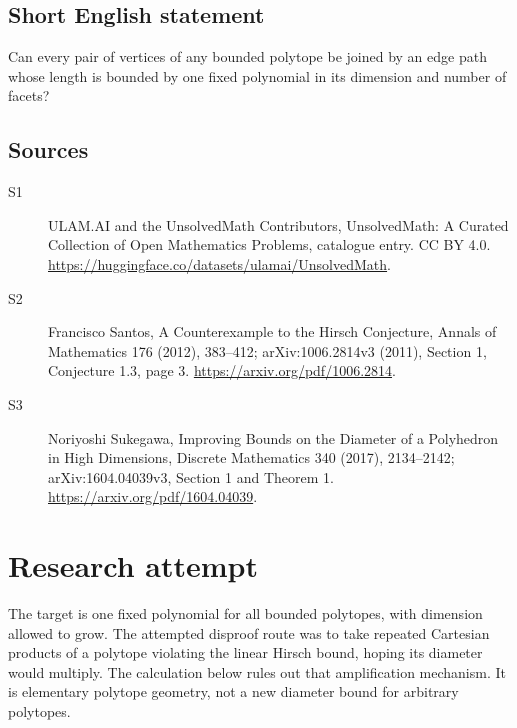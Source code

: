 \documentclass[11pt]{article}
\begin{document}
\subsection{Short English statement}
Can every pair of vertices of any bounded polytope be joined by an edge path whose length is bounded by one fixed polynomial in its dimension and number of facets?
\subsection{Sources}
\begin{description}
\item[S1] ULAM.AI and the UnsolvedMath Contributors, UnsolvedMath: A Curated Collection of Open Mathematics Problems, catalogue entry. CC BY 4.0. \url{https://huggingface.co/datasets/ulamai/UnsolvedMath}.
\item[S2] Francisco Santos, A Counterexample to the Hirsch Conjecture, Annals of Mathematics 176 (2012), 383--412; arXiv:1006.2814v3 (2011), Section 1, Conjecture 1.3, page 3. \url{https://arxiv.org/pdf/1006.2814}.
\item[S3] Noriyoshi Sukegawa, Improving Bounds on the Diameter of a Polyhedron in High Dimensions, Discrete Mathematics 340 (2017), 2134--2142; arXiv:1604.04039v3, Section 1 and Theorem 1. \url{https://arxiv.org/pdf/1604.04039}.
\end{description}
\label{end:statement}


\section{Research attempt}
The target is one fixed polynomial for all bounded polytopes, with dimension allowed to grow. The attempted disproof route was to take repeated Cartesian products of a polytope violating the linear Hirsch bound, hoping its diameter would multiply. The calculation below rules out that amplification mechanism. It is elementary polytope geometry, not a new diameter bound for arbitrary polytopes.
\end{document}
